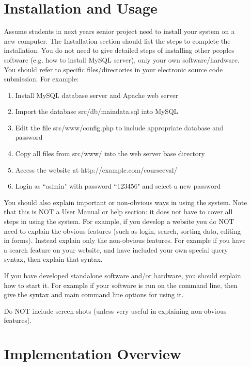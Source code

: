 \documentclass[12pt, a4paper]{report}
\begin{document}
\section{Installation and Usage}


Assume students in next years senior project need to install your system on a new computer. The Installation section should list the steps to complete the installation. You do not need to give detailed steps of installing other peoples software (e.g. how to install MySQL server), only your own software/hardware. You should refer to specific files/directories in your electronic source code submission. For example:

\begin{enumerate}
	\item Install MySQL database server and Apache web server
	\item Import the database src/db/maindata.sql into MySQL
	\item Edit the file src/www/config.php to include appropriate database and password
	\item Copy all files from src/www/ into the web server base directory
	\item Access the website at http://example.com/courseeval/
	\item Login as ``admin" with password ``123456" and select a new password
\end{enumerate}

You should also explain important or non-obvious ways in using the system. Note that this is NOT a User Manual or help section: it does not have to cover all steps in using the system. For example, if you develop a website you do NOT need to explain the obvious features (such as login, search, sorting data, editing in forms). Instead explain only the non-obvious features. For example if you have a search feature on your website, and have included your own special query syntax, then explain that syntax.

If you have developed standalone software and/or hardware, you should explain how to start it. For example if your software is run on the command line, then give the syntax and main command line options for using it.

Do NOT include screen-shots (unless very useful in explaining non-obvious features).

\section{Implementation Overview}
\end{document}
